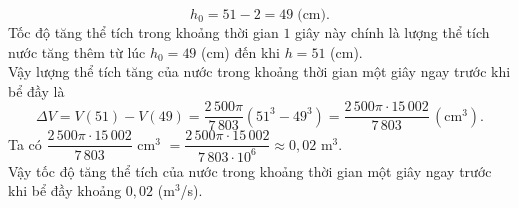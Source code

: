 \begin{ex}
{		\[h_0 = 51 - 2 = 49 \;\text{(cm)}.\]
		Tốc độ tăng thể tích trong khoảng thời gian $1$ giây này chính là lượng thể tích nước tăng thêm từ lúc $h_0=49$ (cm) đến khi $h=51$ (cm).\\
		Vậy lượng thể tích tăng của nước trong khoảng thời gian một giây ngay trước khi bể đầy là
		\[\Delta V=V(51)-V(49)= \dfrac{2\,500\pi}{7\,803}(51^3-49^3)= \dfrac{2\,500\pi \cdot 15\,002}{7\,803} \, \left(\text{cm}^3\right).\]
		Ta có $\dfrac{2\,500\pi\cdot 15\,002}{7\,803}$ cm$^3$ $=\dfrac{2\,500\pi\cdot 15\,002}{7\,803\cdot 10^6}\approx 0{,}02$ m$^3$.\\
		Vậy tốc độ tăng thể tích của nước trong khoảng thời gian một giây ngay trước khi bể đầy khoảng $0{,}02$ (m$^3$/s).
	}
\end{ex}

